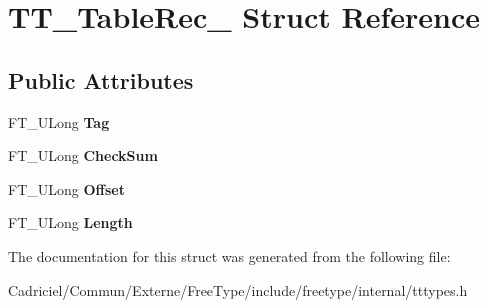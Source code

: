 \hypertarget{struct_t_t___table_rec__}{}\section{T\+T\+\_\+\+Table\+Rec\+\_\+ Struct Reference}
\label{struct_t_t___table_rec__}
\subsection*{Public Attributes}
\begin{DoxyCompactItemize}
\item 
F\+T\+\_\+\+U\+Long {\bfseries Tag}\hypertarget{struct_t_t___table_rec___aaccaf9e9d3421fc37fa6e51875534995}{}\label{struct_t_t___table_rec___aaccaf9e9d3421fc37fa6e51875534995}

\item 
F\+T\+\_\+\+U\+Long {\bfseries Check\+Sum}\hypertarget{struct_t_t___table_rec___aacf9207fae3522bb65359c2288900fca}{}\label{struct_t_t___table_rec___aacf9207fae3522bb65359c2288900fca}

\item 
F\+T\+\_\+\+U\+Long {\bfseries Offset}\hypertarget{struct_t_t___table_rec___a91840e1cee040f8da6a34a081dda17b6}{}\label{struct_t_t___table_rec___a91840e1cee040f8da6a34a081dda17b6}

\item 
F\+T\+\_\+\+U\+Long {\bfseries Length}\hypertarget{struct_t_t___table_rec___aa0d3a1f4491bf4418bc26241bdd7d21b}{}\label{struct_t_t___table_rec___aa0d3a1f4491bf4418bc26241bdd7d21b}

\end{DoxyCompactItemize}


The documentation for this struct was generated from the following file\+:\begin{DoxyCompactItemize}
\item 
Cadriciel/\+Commun/\+Externe/\+Free\+Type/include/freetype/internal/tttypes.\+h\end{DoxyCompactItemize}
